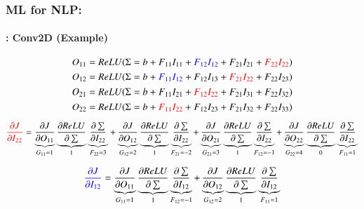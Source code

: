 \documentclass[xcolor=table]{beamer}
\begin{document}
	\begin{frame}
		\frametitle{ML for NLP: \insertsection}
		\framesubtitle{\insertsubsection: Conv2D (Example)}
		
		\begin{center}
			\vskip-6pt
		\end{center}\vskip-16pt
		
		{\scriptsize 
			\[O_{11} = ReLU(\Sigma = b + F_{11} I_{11} + \textcolor{blue}{F_{12} I_{12}} + F_{21} I_{21} + \textcolor{red}{F_{22} I_{22}})  \]
			\[O_{12} = ReLU(\Sigma = b + \textcolor{blue}{F_{11} I_{12}} + F_{12} I_{13} + \textcolor{red}{F_{21} I_{22}} + F_{22} I_{23})  \]
			\[O_{21} = ReLU(\Sigma = b + F_{11} I_{21} + \textcolor{red}{F_{12} I_{22}} + F_{21} I_{31} + F_{22} I_{32})  \]
			\[O_{22} = ReLU(\Sigma = b + \textcolor{red}{F_{11} I_{22}} + F_{12} I_{23} + F_{21} I_{32} + F_{22} I_{33})  \]
			
			\[\textcolor{red}{\frac{\partial J}{\partial I_{22}}} 
			= \underbrace{\frac{\partial J}{\partial O_{11}}}_{G_{11} = 1} 
			\underbrace{\frac{\partial ReLU}{\partial \sum}}_{1} 
			\underbrace{\frac{\partial \sum}{\partial I_{22}}}_{F_{22} = 3}
			+ \underbrace{\frac{\partial J}{\partial O_{12}}}_{G_{12} = 2} 
			\underbrace{\frac{\partial ReLU}{\partial \sum}}_{1} 
			\underbrace{\frac{\partial \sum}{\partial I_{22}}}_{F_{21} = -2}
			+ \underbrace{\frac{\partial J}{\partial O_{21}}}_{G_{21} = 3} 
			\underbrace{\frac{\partial ReLU}{\partial \sum}}_{1} 
			\underbrace{\frac{\partial \sum}{\partial I_{22}}}_{F_{12} = -1}
			+ \underbrace{\frac{\partial J}{\partial O_{22}}}_{G_{22} = 4} 
			\underbrace{\frac{\partial ReLU}{\partial \sum}}_{0} 
			\underbrace{\frac{\partial \sum}{\partial I_{22}}}_{F_{11} = 1}\]
			
			\[\textcolor{blue}{\frac{\partial J}{\partial I_{12}}} 
			= \underbrace{\frac{\partial J}{\partial O_{11}}}_{G_{11} = 1} 
			\underbrace{\frac{\partial ReLU}{\partial \sum}}_{1} 
			\underbrace{\frac{\partial \sum}{\partial I_{12}}}_{F_{12} = -1}
			+ \underbrace{\frac{\partial J}{\partial O_{12}}}_{G_{12} = 2} 
			\underbrace{\frac{\partial ReLU}{\partial \sum}}_{1} 
			\underbrace{\frac{\partial \sum}{\partial I_{12}}}_{F_{11} = 1}\]
		}
		
	\end{frame}
\end{document}
